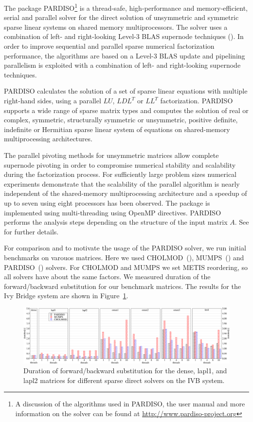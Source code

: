 {\color{blue}
The package PARDISO\footnote{A discussion of the algorithms used in
PARDISO, the user manual and more information on the solver can be found at
\url{http://www.pardiso-project.org}}
is a thread-safe, high-performance and memory-effi\-cient,
serial and parallel solver for the direct solution of unsymmetric
and symmetric sparse linear systems on shared memory multiprocessors.
The solver uses a combination
of left- and right-looking Level-3 BLAS supernode techniques
(\cite{AndBBDDDGHMOS99}).
In order to improve sequential and parallel sparse
numerical factorization performance, the algorithms are based on
a Level-3 BLAS update and pipelining parallelism is exploited with
a combination of left- and right-looking supernode techniques.

PARDISO calculates the solution of a set of sparse linear equations
with multiple right-hand sides, using a parallel $LU$, $LDL^T$ or $LL^T$
factorization. PARDISO supports a wide range of sparse matrix types and
computes the solution of real or complex,
symmetric, structurally symmetric or unsymmetric, positive definite,
indefinite or Hermitian sparse linear system of equations on shared-memory
multiprocessing architectures.

The parallel pivoting methods for unsymmetric matrices allow complete supernode pivoting in order to compromise numerical stability and scalability during the factorization process. For sufficiently large problem sizes numerical experiments demonstrate that the scalability of the parallel algorithm is nearly independent of the shared-memory multiprocessing architecture and a speedup of up to seven using eight processors has been observed. The package is implemented using multi-threading using OpenMP directives. PARDISO performs the analysis steps depending on the structure
of the input matrix $A$. See \cite{Bollhofer2020} for further details.

For comparison and to motivate the usage of the PARDISO solver, we run initial benchmarks on varouos matrices. Here we used CHOLMOD~(\cite{cholmod2008,doi:10.1137/1.9780898718881}), MUMPS~(\cite{amestoy-2000,amestoy-2001,amestoy-2006}) and PARDISO~(\cite{schenk-2004,kuzmin-2013}) solvers. For CHOLMOD and MUMPS we set METIS reordering, so all solvers have about the same factors. We measured duration of the forward/backward substitution for our benchmark
matrices. The results for the Ivy Bridge system are shown in Figure~\ref{fig:solvers}.
}

%
\begin{figure}[tp]
  \centering
	\includegraphics[width=\textwidth,clip=true]{images/SolverComparison}
   \caption{Duration of forward/backward substitution for the dense, lapl1, and lapl2 matrices for different sparse direct solvers on the IVB system.}
  \label{fig:solvers}
\end{figure}


